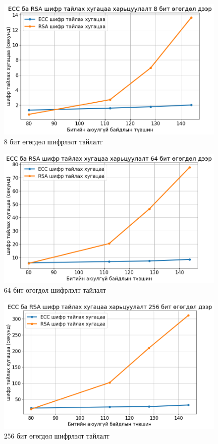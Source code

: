 \begin{figure}
	\centering
	\includegraphics[scale=0.65]{assets/graphs/4.png}
	\caption{8 бит өгөгдөл шифрлэлт тайлалт}
	\label{fig:architecture}
\end{figure}
\begin{figure}
	\centering
	\includegraphics[scale=0.65]{assets/graphs/5.png}
	\caption{64 бит өгөгдөл шифрлэлт тайлалт}
	\label{fig:architecture}
\end{figure}
\begin{figure}
	\centering
	\includegraphics[scale=0.65]{assets/graphs/6.png}
	\caption{256 бит өгөгдөл шифрлэлт тайлалт}
	\label{fig:architecture}
\end{figure}
